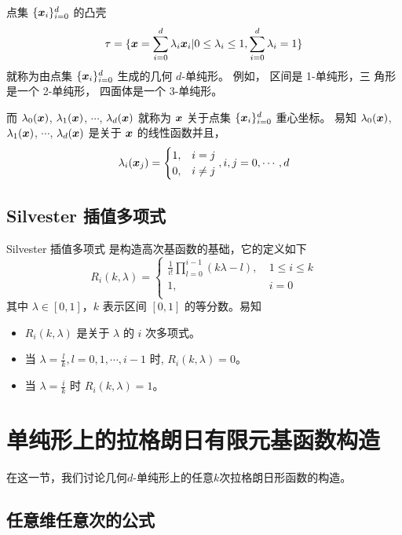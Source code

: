 \documentclass{article}
\begin{document}
点集 $\{{\boldsymbol x}_i\}_{i=0}^d$ 的凸壳
\begin{equation}
    \tau = \{{\boldsymbol x} = \sum_{i=0}^{d}\lambda_i{\boldsymbol x}_i | 0\leq \lambda_i \leq
    1, \sum_{i=0}^d\lambda_i = 1\}
\end{equation}
就称为由点集 $\{{\boldsymbol x}_i\}_{i=0}^d$ 生成的几何 $d$-单纯形。 例如， 区间是 1-单纯形，三
角形是一个 2-单纯形， 四面体是一个 3-单纯形。

而 $\lambda_0({\boldsymbol x})$, $\lambda_1({\boldsymbol x})$, $\cdots$, $\lambda_{d}({\boldsymbol x})$ 就称为
${\boldsymbol x}$
关于点集 $\{{\boldsymbol x}_i\}_{i=0}^d$ 重心坐标。  易知 $\lambda_0({\boldsymbol x})$,
$\lambda_1({\boldsymbol x})$, $\cdots$, $\lambda_{d}({\boldsymbol x})$ 是关于 ${\boldsymbol x}$ 的线性函数并且，
\begin{equation}
    \lambda_i({\boldsymbol x}_j) = 
    \begin{cases}
        1, & i = j\\
        0, & i\not= j
    \end{cases}, 
    i, j = 0, \cdots, d
\end{equation}

\subsection{Silvester 插值多项式}

Silvester 插值多项式\cite{sheng2008} 是构造高次基函数的基础，它的定义如下
$$
R_i(k,\lambda)=
\begin{cases}
\frac{1}{i!}\prod_{l=0}^{i-1} (k\lambda-l),~& 1\leq i\leq k\\
1,& i=0\\
\end{cases}
$$
其中 $\lambda \in [0,1]$，$k$ 表示区间 $[0,1]$ 的等分数。易知 

\begin{itemize}
    \item $R_i(k, \lambda)$ 是关于 $\lambda$ 的 $i$ 次多项式。
    \item 当 $\lambda= \frac{l}{k}, l=0, 1, \cdots, i-1$ 时, $R_i(k, \lambda) =0$。
    \item 当 $\lambda=\frac{i}{k}$ 时 $R_i(k, \lambda) = 1$。
\end{itemize}

\section{单纯形上的拉格朗日有限元基函数构造}

在这一节，我们讨论几何$d$-单纯形上的任意$k$次拉格朗日形函数的构造。

\subsection{任意维任意次的公式}
\end{document}
